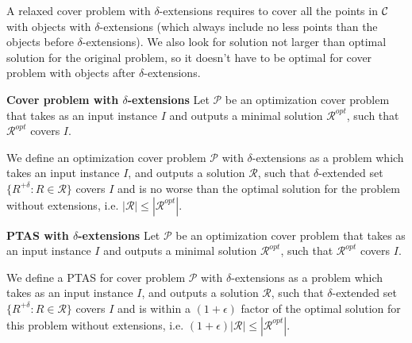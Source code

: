 A relaxed cover problem with $\delta$-extensions
requires to cover all the points in $\mathcal{C}$
with objects with $\delta$-extensions (which always 
include no less points than the objects
before $\delta$-extensions). 
We also look for solution not larger than
optimal solution for the original problem,
so it doesn't have to be optimal for cover problem with 
objects after $\delta$-extensions.


\begin{defi}\textbf{Cover problem with $\delta$-extensions}
Let $\mathcal{P}$ be an optimization cover problem 
that takes as an input instance $I$
and outputs a minimal solution $\mathcal{R}^{opt}$, such that
$\mathcal{R}^{opt}$ covers $I$.

We define an optimization cover problem $\mathcal{P}$
with $\delta$-extensions as a problem which
takes an input instance $I$,
and outputs a solution $\mathcal{R}$, such that $\delta$-extended set
$\{ R^{+\delta} :  R \in \mathcal{R} \}$ covers $I$
and is no worse than the optimal solution for the problem without
extensions, i.e. $|\mathcal{R}| \le |\mathcal{R}^{opt}|$.
\end{defi}


\begin{defi}\textbf{PTAS with $\delta$-extensions}
Let $\mathcal{P}$ be an optimization cover problem 
that takes as an input instance $I$
and outputs a minimal solution $\mathcal{R}^{opt}$, such that
$\mathcal{R}^{opt}$ covers $I$.


We define a PTAS for cover problem $\mathcal{P}$
with $\delta$-extensions as a problem which
takes as an input instance $I$,
and outputs a solution $\mathcal{R}$, such that $\delta$-extended set
$\{ R^{+\delta} :  R \in \mathcal{R} \}$ covers $I$
and is within a $(1+\epsilon)$ factor of the optimal
solution for this problem without
extensions, i.e. $(1+\epsilon)|\mathcal{R}| \le |\mathcal{R}^{opt}|$.

\end{defi}
